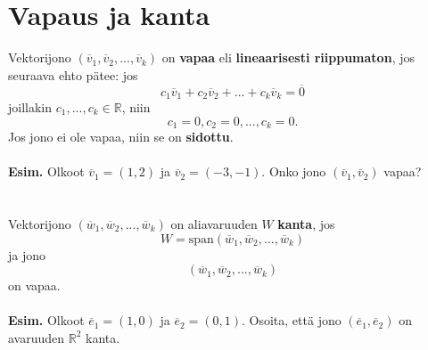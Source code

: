 \documentclass{article}
\begin{document}
\newpage
\section{Vapaus ja kanta}
Vektorijono \((\overline{v}_1, \overline{v}_2, ..., \overline{v}_k)\) on \textbf{vapaa} eli \textbf{lineaarisesti riippumaton}, jos seuraava ehto pätee: jos $$c_1\overline{v}_1+c_2\overline{v}_2 + ... + c_k\overline{v}_k=\overline{0}$$ joillakin \(c_1, ..., c_k \in \mathbb{R}\), niin $$c_1=0, c_2=0, ..., c_k=0.$$
Jos jono ei ole vapaa, niin se on \textbf{sidottu}.\\
 \\
\textbf{Esim.} Olkoot \(\overline{v}_1=(1, 2)\) ja \(\overline{v}_2=(-3, -1)\). Onko jono \((\overline{v}_1, \overline{v}_2)\) vapaa?\\
 \\
  \\
Vektorijono \((\overline{w}_1, \overline{w}_2, ..., \overline{w}_k)\) on aliavaruuden \(W\) \textbf{kanta}, jos $$W=\text{span}(\overline{w}_1, \overline{w}_2, ..., \overline{w}_k)$$ ja jono $$(\overline{w}_1, \overline{w}_2, ..., \overline{w}_k)$$ on vapaa.
 \\
  \\
\textbf{Esim.} Olkoot \(\overline{e}_1=(1, 0)\) ja \(\overline{e}_2=(0, 1)\). Osoita, että jono \((\overline{e}_1, \overline{e}_2)\) on avaruuden \(\mathbb{R}^2\) kanta.

\newpage
\end{document}
